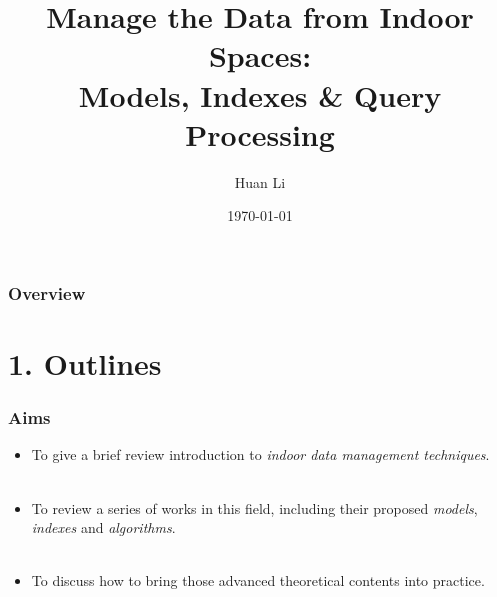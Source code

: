 \documentclass{beamer}
\title[Manage the Data from Indoor Spaces]{Manage the Data from Indoor Spaces: \\Models, Indexes \& Query Processing} %
\author{Huan Li} %
\institute[Zhejiang University] %
{
Database Laboratory, Zhejiang University \\ %
\medskip
\textit{lihuancs@zju.edu.cn} %
}
\date{\today} %
\begin{document}
\begin{frame}
\titlepage %
\end{frame}

\begin{frame}
\frametitle{Overview} %
\setcounter{tocdepth}{1}
\tableofcontents %
\end{frame}

\AtBeginSection[]
{
    \begin{frame}[shrink]
        \tableofcontents[sectionstyle=show/shaded,subsectionstyle=show/shaded/hide]
    \end{frame}
}


\section{1. Outlines} %


\begin{frame}
\frametitle{Aims}
\begin{itemize}
\item To give a brief review introduction to \emph{indoor data management techniques}.
\\~\\
\item To review a series of works in this field, including their proposed \emph{models}, \emph{indexes} and \emph{algorithms}.
\\~\\
\item To discuss how to bring those advanced theoretical contents into practice.
\end{itemize}
\end{frame}
\end{document}
